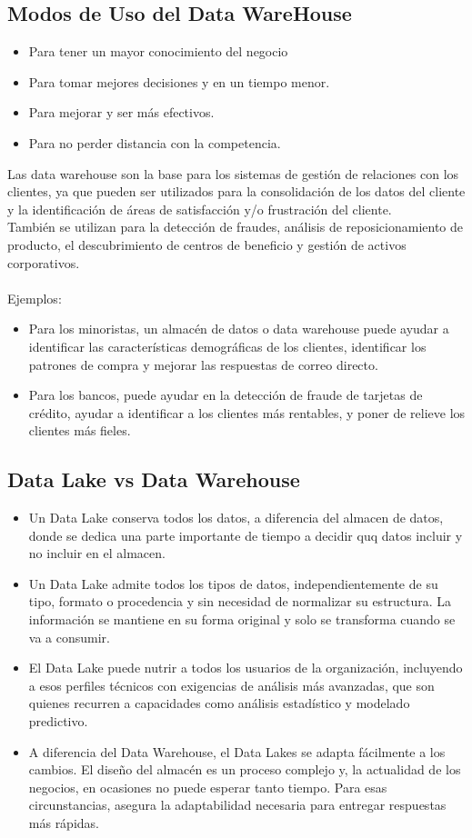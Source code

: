 \documentclass[preprint,12pt]{elsarticle}
\begin{document}
\subsection{Modos de Uso del Data WareHouse}
\begin{itemize}
	\item Para tener un mayor conocimiento del negocio
	\item Para tomar mejores decisiones y en un tiempo menor.
	\item Para mejorar y ser más efectivos.
	\item Para no perder distancia con la competencia.
\end{itemize}
 Las data warehouse son la base para los sistemas de gestión de relaciones con los clientes, ya que pueden ser utilizados para la consolidación de los datos del cliente y la identificación de áreas de satisfacción y/o frustración del cliente.
\\
También se utilizan para la detección de fraudes, análisis de reposicionamiento de producto, el descubrimiento de centros de beneficio y gestión de activos corporativos. 
\\\\Ejemplos:
\begin{itemize}
	\item Para los minoristas, un almacén de datos o data warehouse puede ayudar a identificar las características demográficas de los clientes, identificar los patrones de compra y mejorar las respuestas de correo directo. 
	\item Para los bancos, puede ayudar en la detección de fraude de tarjetas de crédito, ayudar a identificar a los clientes más rentables, y poner de relieve los clientes más fieles.
	
\end{itemize}

\subsection{Data Lake vs Data Warehouse}
\begin{itemize}
	\item Un Data Lake conserva todos los datos, a diferencia del almacen de datos, donde se dedica una parte importante de tiempo a decidir quq datos incluir y no incluir en el almacen.
\item Un Data Lake admite todos los tipos de datos, independientemente de su tipo, formato o procedencia y sin necesidad de normalizar su estructura. La información se mantiene en su forma original y solo se transforma cuando se va a consumir.
	\item El Data Lake puede nutrir a todos los usuarios de la organización, incluyendo a esos perfiles técnicos con exigencias de análisis más avanzadas, que son quienes recurren a capacidades como análisis estadístico y modelado predictivo.
	\item A diferencia del Data Warehouse, el Data Lakes se adapta fácilmente a los cambios. El diseño del almacén es un proceso complejo y, la actualidad de los negocios, en ocasiones no puede esperar tanto tiempo. Para esas circunstancias, asegura la adaptabilidad necesaria para entregar respuestas más rápidas.
	
\end{itemize}
\end{document}
